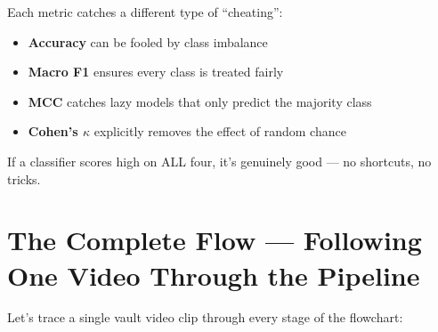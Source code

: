 \documentclass[12pt, a4paper]{article}
\begin{document}
\begin{summarybox}
Each metric catches a different type of ``cheating'':
\begin{itemize}
    \item \textbf{Accuracy} can be fooled by class imbalance
    \item \textbf{Macro F1} ensures every class is treated fairly
    \item \textbf{MCC} catches lazy models that only predict the majority class
    \item \textbf{Cohen's $\kappa$} explicitly removes the effect of random chance
\end{itemize}
If a classifier scores high on ALL four, it's genuinely good — no shortcuts, no tricks.
\end{summarybox}

\newpage
\section{The Complete Flow — Following One Video Through the Pipeline}

Let's trace a single vault video clip through every stage of the flowchart:
\end{document}

